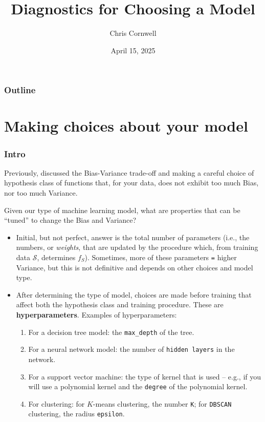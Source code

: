 \documentclass[smaller]{beamer}
\author{Chris Cornwell}
\date{April 15, 2025}
\title{Diagnostics for Choosing a Model}
\theoremstyle{example}
\newcommand{\ttt}[1]{{\small\texttt{#1}}}
\begin{document}
\begin{frame}
\titlepage
\end{frame}

\begin{frame}
    \frametitle{Outline}
    \tableofcontents
\end{frame}

\section{Making choices about your model}

\begin{frame}
\frametitle{Intro}
Previously, discussed the Bias-Variance trade-off and making a careful choice of hypothesis class of functions that, for your data, does not exhibit too much Bias, nor too much Variance.

\pause
Given our type of machine learning model, what are properties that can be ``tuned'' to change the Bias and Variance? 
\pause
\begin{itemize}
    \item Initial, but not perfect, answer is the total number of parameters (i.e., the numbers, or \textit{weights}, that are updated by the procedure which, from training data $\mathcal S$, determines $f_S$). Sometimes, more of these parameters \texttt{=} higher Variance, but this is not definitive and depends on other choices and model type.
    \pause
    \item After determining the type of model, choices are made before training that affect both the hypothesis class and training procedure. These are \textbf{hyperparameters}. Examples of hyperparameters:
    \begin{enumerate}
        \pause
        \item For a decision tree model: the \lstinline[language=Python,basicstyle=\ttfamily]{max_depth} of the tree.
        \pause
        \item For a neural network model: the number of \ttt{hidden layers} in the network.
        \pause
        \item For a support vector machine: the type of kernel that is used {--} e.g., if you will use a polynomial kernel and the \ttt{degree} of the polynomial kernel.
        \pause
        \item For clustering: for $K$-means clustering, the number \ttt{K}; for \ttt{DBSCAN} clustering, the radius \ttt{epsilon}.
    \end{enumerate}
\end{itemize}

\end{frame}
\end{document}
